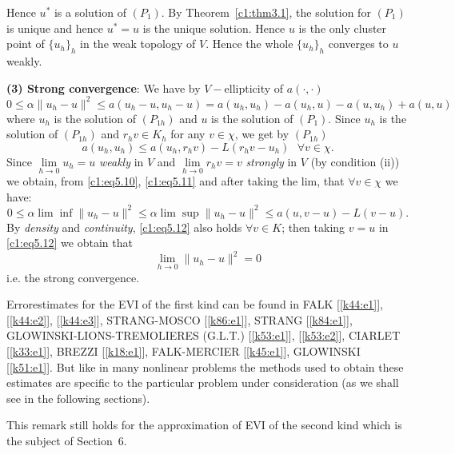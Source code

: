 Hence $u^*$ is a solution of $(P_1)$. By Theorem~\ref{c1:thm3.1}, the solution for
$(P_1)$ is unique and hence $u^* = u$ is the unique solution. Hence
$u$ is the only cluster point of $\{u_h\}_h$ in the weak topology of
$V$. Hence the whole $\{u_h\}_h$ converges to $u$ weakly. 

\medskip
\noindent\textbf{(3) Strong convergence}: We have by $V-$ellipticity
of $a(\cdot , \cdot)$ 
\begin{equation}
0 \leq \alpha \parallel u_h - u \parallel^2 \leq a(u_h - u, u_h - u) =
a(u_h, u_h) - a(u_h, u)-a(u, u_h) + a(u, u) \tag{5.10}\label{c1:eq5.10} 
\end{equation}
where $u_h$ is the solution of $(P_{1h})$ and $u$ is the solution of
$(P_1)$. Since $u_h$ is the solution of $(P_{1h})$ and $r_h v \in
K_h$ for any $v \in \chi$, we get by $(P_{1h})$ 
\begin{equation}
a(u_h, u_h) \leq a(u_h, r_h v) - L(r_h v - u_h) ~~~\forall v \in
\chi. \tag{5.11}\label{c1:eq5.11} 
\end{equation}
Since $\lim \limits_{h \to 0} u_h = u$ \textit{weakly} in $V$ and
$\lim \limits_{h \to 0} r_h v= v$ \textit{strongly} in $V$ (by
condition (ii)) we obtain, from \eqref{c1:eq5.10}, \eqref{c1:eq5.11} and after taking the
lim, that $\forall v \in \chi$ we have: 
\begin{equation}
0 \leq \alpha \lim \inf \parallel u_h - u \parallel^2 \leq \alpha \lim
\sup \parallel u_h - u \parallel^2 \leq a (u, v - u) - L(v -
u). \tag{5.12}\label{c1:eq5.12} 
\end{equation}
By \textit{density} and \textit{continuity}, \eqref{c1:eq5.12} also holds
$\forall v \in K$; then taking $v =u$ in \eqref{c1:eq5.12} we obtain that  
$$
\lim \limits_{h \to 0} \parallel u_h - u \parallel^2 = 0
$$
i.e. the strong convergence. 

\begin{remark}%
Error\pageoriginale estimates for the EVI of the first kind can be
found in FALK 
[\ref{k44:e1}], [\ref{k44:e2}], [\ref{k44:e3}], STRANG-MOSCO
[\ref{k86:e1}], STRANG [\ref{k84:e1}], 
GLOWIN\-SKI-LIONS-TREMOLIERES (G.L.T.) [\ref{k53:e1}], [\ref{k53:e2}],
CIARLET [\ref{k33:e1}], BREZZI 
[\ref{k18:e1}], FALK-MERCIER [\ref{k45:e1}], GLOWINSKI
[\ref{k51:e1}]. But like in many nonlinear 
problems the methods used to obtain these estimates are specific to
the particular problem under consideration (as we shall see in the
following sections). 

This remark still holds for the approximation of EVI of the second
kind which is the subject of Section~6. 
\end{remark}

